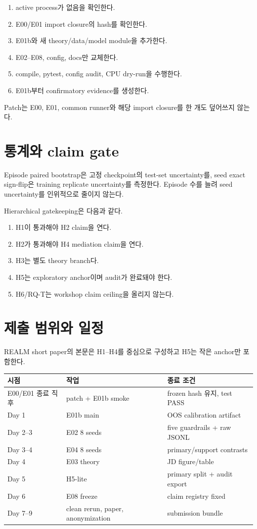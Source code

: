 \documentclass[10.5pt,a4paper]{article}
\begin{document}
\begin{enumerate}
\item active process가 없음을 확인한다.
\item E00/E01 import closure의 hash를 확인한다.
\item E01b와 새 theory/data/model module을 추가한다.
\item E02--E08, config, docs만 교체한다.
\item compile, pytest, config audit, CPU dry-run을 수행한다.
\item E01b부터 confirmatory evidence를 생성한다.
\end{enumerate}

Patch는 E00, E01, common runner와 해당 import closure를 한 개도 덮어쓰지 않는다.

\section{통계와 claim gate}
Episode paired bootstrap은 고정 checkpoint의 test-set uncertainty를, seed exact sign-flip은 training replicate uncertainty를 측정한다. Episode 수를 늘려 seed uncertainty를 인위적으로 줄이지 않는다.

Hierarchical gatekeeping은 다음과 같다.
\begin{enumerate}
\item H1이 통과해야 H2 claim을 연다.
\item H2가 통과해야 H4 mediation claim을 연다.
\item H3는 별도 theory branch다.
\item H5는 exploratory anchor이며 audit가 완료돼야 한다.
\item H6/RQ-T는 workshop claim ceiling을 올리지 않는다.
\end{enumerate}

\section{제출 범위와 일정}
REALM short paper의 본문은 H1--H4를 중심으로 구성하고 H5는 작은 anchor만 포함한다.

\begin{center}
\begin{tabular}{lll}
\toprule
시점 & 작업 & 종료 조건 \\
\midrule
E00/E01 종료 직후 & patch + E01b smoke & frozen hash 유지, test PASS \\
Day 1 & E01b main & OOS calibration artifact \\
Day 2--3 & E02 8 seeds & five guardrails + raw JSONL \\
Day 3--4 & E04 8 seeds & primary/support contrasts \\
Day 4 & E03 theory & JD figure/table \\
Day 5 & H5-lite & primary split + audit export \\
Day 6 & E08 freeze & claim registry fixed \\
Day 7--9 & clean rerun, paper, anonymization & submission bundle \\
\bottomrule
\end{tabular}
\end{center}
\end{document}
